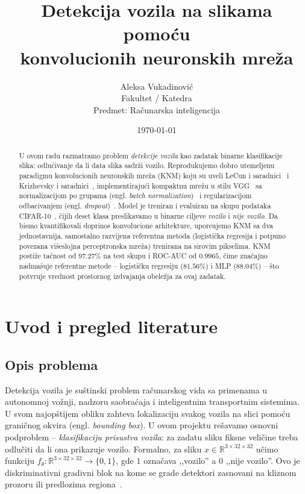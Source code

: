 \documentclass[11pt,a4paper]{article}
\title{\textbf{Detekcija vozila na slikama pomo\'cu\\konvolucionih neuronskih mre\v za}}
\author{%
  Aleksa Vukadinovi\'c\\
  \small Fakultet / Katedra\\
  \small Predmet: Ra\v cunarska inteligencija
}
\date{\today}
\begin{document}
\maketitle

\begin{abstract}
\noindent
U ovom radu razmatramo problem \emph{detekcije vozila} kao zadatak binarne
klasifikacije slika: odlu\v civanje da li data slika sadr\v zi vozilo.
Reprodukujemo dobro utemeljenu paradigmu konvolucionih neuronskih mre\v za
(KNM) koju su uveli LeCun i saradnici~\cite{lecun1998gradient} i Krizhevsky i
saradnici~\cite{krizhevsky2012imagenet}, implementiraju\'ci kompaktnu mre\v zu
u stilu VGG~\cite{simonyan2015very} sa normalizacijom po grupama (engl.
\emph{batch normalization})~\cite{ioffe2015batch} i regularizacijom odbacivanjem
(engl. \emph{dropout})~\cite{srivastava2014dropout}. Model je treniran i
evaluiran na skupu podataka CIFAR-10~\cite{krizhevsky2009learning}, \v cijih
deset klasa preslikavamo u binarne ciljeve \emph{vozilo} i \emph{nije vozilo}.
Da bismo kvantifikovali doprinos konvolucione arhitekture, upore\dj ujemo KNM
sa dva jednostavnija, samostalno razvijena referentna metoda (logisti\v cka
regresija i potpuno povezana vi\v seslojna perceptronska mre\v za) trenirana na
sirovim pikselima. KNM posti\v ze ta\v cnost od $97.27\%$ na test skupu i
ROC-AUC od $0.9965$, \v cime zna\v cajno nadma\v suje referentne metode --
logisti\v cku regresiju ($81.56\%$) i MLP ($88.04\%$) -- \v sto potvr\dj uje
vrednost prostornog izdvajanja obele\v zja za ovaj zadatak.
\end{abstract}

\tableofcontents
\newpage

\section{Uvod i pregled literature}

\subsection{Opis problema}
Detekcija vozila je su\v stinski problem ra\v cunarskog vida sa primenama u
autonomnoj vo\v znji, nadzoru saobra\'caja i inteligentnim transportnim
sistemima. U svom naj\-op\-\v stijem obliku zahteva lokalizaciju svakog vozila
na slici pomo\'cu grani\v cnog okvira (engl. \emph{bounding box}). U ovom
projektu re\v savamo osnovni podproblem -- \emph{klasifikaciju prisustva
vozila}: za zadatu sliku fiksne veli\v cine treba odlu\v citi da li ona
prikazuje vozilo. Formalno, za sliku
$x \in \mathbb{R}^{3\times 32 \times 32}$ u\v cimo funkciju
$f_\theta : \mathbb{R}^{3\times 32 \times 32} \to \{0, 1\}$, gde $1$ ozna\v cava
,,vozilo'' a $0$ ,,nije vozilo''. Ovo je diskriminativni gradivni blok na kome
se grade detektori zasnovani na kliznom prozoru ili predlozima
regiona~\cite{ren2015faster,redmon2016you}.
\end{document}
